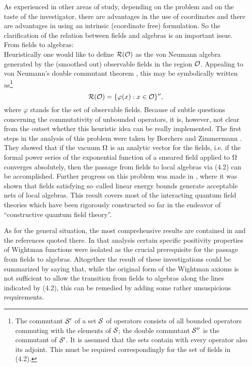 As experienced in other areas of study, depending on the problem and
on the taste of the investigator, there are advantages in the use of
coordinates and there are advantages in using an intrinsic (coordinate
free) formulation. So the clarification of the relation between fields
and algebras is an important issue.\\[2mm]
{\subsect {}From fields to algebras:}\\[2mm]
Heuristically one would like to define ${\cal R}({\cal O})$ as the von Neumann algebra
generated by the (smoothed out) observable fields in the region $\cal
O$. Appealing to von Neumann's double commutant theorem \cite{KaRi}, 
this may be symbolically written as\footnote{The commutant 
${\cal S}^\prime$ of 
a set ${\cal S}$ of operators consists of all bounded operators commuting
with the elements of ${\cal S}$; the double commutant ${\cal
  S}^{\prime \prime}$ is the commutant of ${\cal S}^\prime$.
It is assumed that the sets contain with every operator also its
adjoint. This must be required correspondingly for the set of 
fields in (4.2).} 
\begin{equation}
{\cal R}({\cal O}) = \{ \varphi (x) : x \in \cal O \}^{\prime \prime}, 
\end{equation}
where $\varphi$ stands for the set of observable fields. Because of
subtle questions concerning the commutativity of unbounded operators, it
is, however, not clear from the outset whether this heuristic idea can
be really implemented. The first steps in the analysis of this problem
were taken by Borchers and Zimmermann \cite{BoZi}. They showed that if
the vacuum ${\Omega}$ is an analytic vector for the fields, i.e. if the
formal power series of the exponential function of a smeared field
applied to ${\Omega}$ converges absolutely, then the passage from fields to
local algebras via (4.2) can be accomplished. Further progress on this
problem was made in \cite{DrFr}, where it was shown that fields
satisfying so--called linear energy bounds generate acceptable nets of
local algebras. This result covers most of the interacting quantum field
theories which have been rigorously constructed so far in the
endeavor of ``constructive quantum field theory''. 

As for the general
situation, the most comprehensive results are contained in \cite{BoYn}
and the references quoted there. In that analysis certain specific
positivity properties of Wightman functions were isolated as the
crucial prerequisite for the passage from fields to
algebras. Altogether the result of these investigations could be
summarized by saying that, while the original form of the Wightman
axioms is not sufficient to allow the transition from fields to algebras
along the lines indicated by (4.2), this can be remedied by adding
some rather unsuspicious requirements. 

